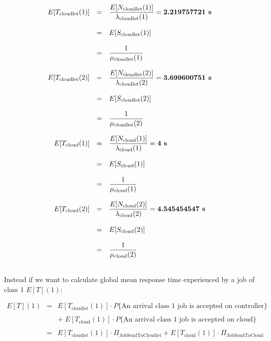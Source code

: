 \documentclass[10pt,a4paper]{article}
\begin{document}
\begin{equation}
\begin{array} {rcl} 
E[T_{\text{cloudlet}}(1)] & = & \dfrac{E[N_{\text{cloudlet}}(1)]}{\lambda_{\text{cloudlet}}(1)} = \textbf{2.219757721 \text{s}} \\
\\
& = & E[S_{\text{cloudlet}}(1)] \\
\\
& = & \dfrac{1}{\mu_{\text{cloudlet}}(1)} \\
\\
E[T_{\text{cloudlet}}(2)] & = & \dfrac{E[N_{\text{cloudlet}}(2)]}{\lambda_{\text{cloudlet}}(2)} = \textbf{3.699600751 \text{s}} \\
\\
& = & E[S_{\text{cloudlet}}(2)] \\
\\
& = & \dfrac{1}{\mu_{\text{cloudlet}}(2)} \\
\\
E[T_{\text{cloud}}(1)] & = & \dfrac{E[N_{\text{cloud}}(1)]}{\lambda_{\text{cloud}}(1)} = \textbf{4 \text{s}} \\ 
\\
& = & E[S_{\text{cloud}}(1)] \\
\\
& = & \dfrac{1}{\mu_{\text{cloud}}(1)} \\
\\
E[T_{\text{cloud}}(2)] & = & \dfrac{E[N_{\text{cloud}}(2)]}{\lambda_{\text{cloud}}(2)} = \textbf{4.545454547 \text{s}} \\
\\
& = & E[S_{\text{cloud}}(2)] \\
\\
& = & \dfrac{1}{\mu_{\text{cloud}}(2)} \\
\\
\end{array}
\end{equation}

Instead if we want to calculate global mean response time experienced by a job of class 1 $E[T](1)$:

\begin{equation}
\begin{array} {lcl} 
E[T](1) & = & E[T_{\text{cloudlet}}(1)]\cdot P\lbrace\text{An arrival class 1 job is accepted on controller}\rbrace \\
\\
& & +\; E[T_{\text{cloud}}(1)]\cdot P\lbrace\text{An arrival class 1 job is accepted on cloud}\rbrace \\
\\
& = & E[T_{\text{cloudlet}}(1)]\cdot \Pi_{\text{JobSendToCloudlet}} + E[T_{\text{cloud}}(1)]\cdot \Pi_{\text{JobSendToCloud}} \\

\end{array}
\end{equation}
\end{document}
